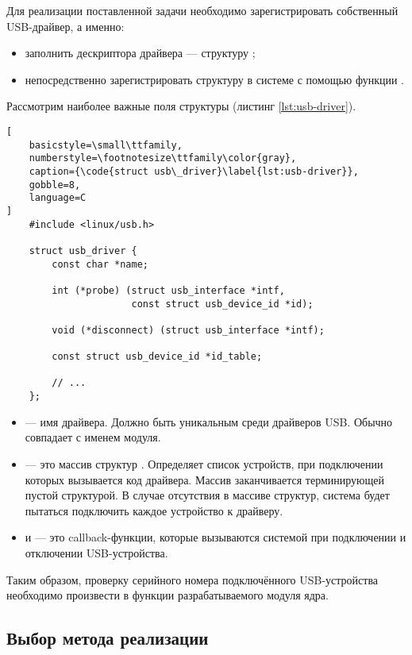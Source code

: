 Для реализации поставленной задачи необходимо зарегистрировать собственный USB-драйвер, а именно:
\begin{itemize}
	\item заполнить дескриптора драйвера — структуру ;
	\item непосредственно зарегистрировать структуру в системе с помощью функции  \cite{ubs-driver}.
\end{itemize}

Рассмотрим наиболее важные поля структуры  (листинг \ref{lst:usb-driver}).

\begin{lstlisting}[
	basicstyle=\small\ttfamily,
	numberstyle=\footnotesize\ttfamily\color{gray},
	caption={\code{struct usb\_driver}\label{lst:usb-driver}},
	gobble=8,
	language=C
]
	#include <linux/usb.h>

	struct usb_driver {
		const char *name;

		int (*probe) (struct usb_interface *intf,
		              const struct usb_device_id *id);

		void (*disconnect) (struct usb_interface *intf);

		const struct usb_device_id *id_table;

		// ...
	};
\end{lstlisting}

\begin{itemize}
	\item {} — имя драйвера.
	Должно быть уникальным среди драйверов USB.
	Обычно совпадает с именем модуля.
	\item {} — это массив структур .
	Определяет список устройств, при подключении которых вызывается код драйвера.
	Массив заканчивается терминирующей пустой структурой.
	В случае отсутствия в массиве структур, система будет пытаться подключить каждое устройство к драйверу.
	\item {} и  — это callback-функции, которые вызываются системой при подключении и отключении USB-устройства.
\end{itemize}

Таким образом, проверку серийного номера подключённого USB-устройства необходимо произвести в функции  разрабатываемого модуля ядра.

\subsection{Выбор метода реализации}

